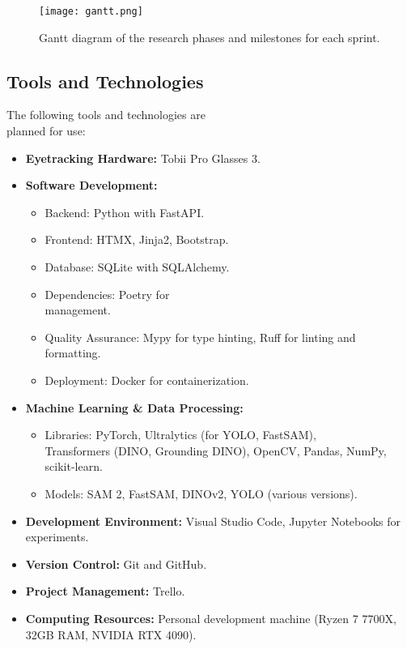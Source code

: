 \documentclass[english]{hogent-article}
\begin{document}
\begin{figure*}
  \centering
  \texttt{[image: gantt.png]}
  \caption{\label{fig:gantt}Gantt diagram of the research phases and milestones for each sprint.}
\end{figure*}

\subsection{Tools and Technologies}

The following tools and technologies are\\ planned for use:
\begin{itemize}
    \item \textbf{Eyetracking Hardware:} Tobii Pro Glasses 3.
    \item \textbf{Software Development:}
        \begin{itemize}
            \item Backend: Python with FastAPI.
            \item Frontend: HTMX, Jinja2, Bootstrap.
            \item Database: SQLite with SQLAlchemy.
            \item Dependencies: Poetry for\\ management.
            \item Quality Assurance: Mypy for type hinting, Ruff for linting and formatting.
            \item Deployment: Docker for containerization.
        \end{itemize}
    \item \textbf{Machine Learning \& Data Processing:}
        \begin{itemize}
            \item Libraries: PyTorch, Ultralytics (for YOLO, FastSAM),\\ Transformers (DINO, Grounding DINO), OpenCV, Pandas, NumPy, scikit-learn.
            \item Models: SAM 2, FastSAM, DINOv2, YOLO (various versions).
        \end{itemize}
    \item \textbf{Development Environment:} Visual Studio Code, Jupyter Notebooks for experiments.
    \item \textbf{Version Control:} Git and GitHub.
    \item \textbf{Project Management:} Trello.
    \item \textbf{Computing Resources:} Personal development machine (Ryzen 7 7700X, 32GB RAM, NVIDIA RTX 4090).
\end{itemize}
\end{document}
